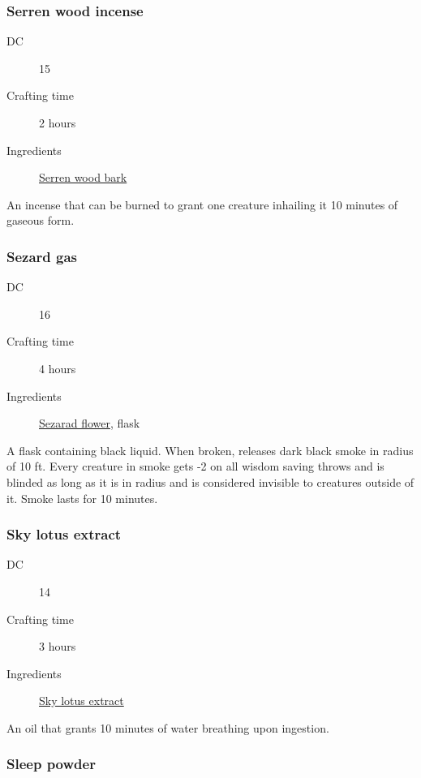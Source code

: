 \subsubsection{Serren wood incense}
\label{Serren wood incense}

\begin{description}
\item [DC] 15
\item [Crafting time] 2 hours
\item [Ingredients] \hyperref[Serren Wood]{Serren wood bark}
\end{description}

An incense that can be burned to grant one creature inhailing it 10 minutes of gaseous form.

\subsubsection{Sezard gas}
\label{Sezard gas}

\begin{description}
\item [DC] 16
\item [Crafting time] 4 hours
\item [Ingredients] \hyperref[Sezarad]{Sezarad flower}, flask
\end{description}

A flask containing black liquid. When broken, releases dark black smoke in radius of 10 ft. 
Every creature in smoke gets -2 on all wisdom saving throws and is blinded as long as it is in radius 
and is considered invisible to creatures outside of it. Smoke lasts for 10 minutes.

\subsubsection{Sky lotus extract}
\label{Sky lotus extract}

\begin{description}
\item [DC] 14
\item [Crafting time] 3 hours
\item [Ingredients] \hyperref[Sky lotus]{Sky lotus extract}
\end{description}

An oil that grants 10 minutes of water breathing upon ingestion.

\subsubsection{Sleep powder}
\label{Sleep powder}

